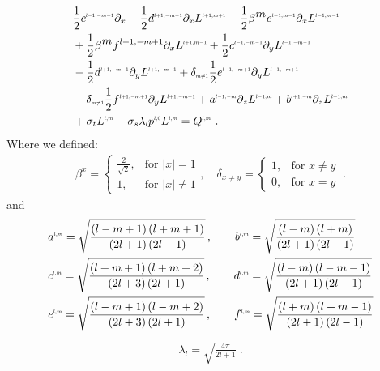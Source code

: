 \documentclass{egpubl}
\begin{document}
\begin{align}
&
\frac{1}{2}c^{\scaleto{l-1,-m-1}{4pt}}\partial_x
-\frac{1}{2}d^{\scaleto{l+1,-m-1}{4pt}}\partial_x L^{\scaleto{l+1,m+1}{4pt}}
-\frac{1}{2}\beta^{\scaleto{m}{4pt}}e^{\scaleto{l-1,m-1}{4pt}}\partial_x L^{\scaleto{l-1,m-1}{4pt}}
\nonumber
\\&
+\frac{1}{2}\beta^{\scaleto{m}{4pt}}f^{l+1,-m+1}\partial_x L^{\scaleto{l+1,m-1}{4pt}}
+\frac{1}{2}c^{\scaleto{l-1,-m-1}{4pt}}\partial_y L^{\scaleto{l-1,-m-1}{4pt}}
\nonumber
\\&
-\frac{1}{2}d^{\scaleto{l+1,-m-1}{4pt}}\partial_y L^{\scaleto{l+1,-m-1}{4pt}}
+\delta_{\scaleto{m\neq 1}{4pt}}\frac{1}{2}e^{\scaleto{l-1,-m+1}{4pt}}\partial_y L^{\scaleto{l-1,-m+1}{4pt}}
\nonumber
\\&
-\delta_{\scaleto{m\neq 1}{4pt}}\frac{1}{2}f^{\scaleto{l+1,-m+1}{4pt}}\partial_y L^{\scaleto{l+1,-m+1}{4pt}}
+a^{\scaleto{l-1,-m}{4pt}}\partial_z L^{\scaleto{l-1,m}{4pt}}
+b^{\scaleto{l+1,-m}{4pt}}\partial_z L^{\scaleto{l+1,m}{4pt}}
\nonumber
\\&
+\sigma_t L^{\scaleto{l,m}{4pt}}
-\sigma_s\lambda_{\scaleto{l}{4pt}}p^{\scaleto{l,0}{4pt}}L^{\scaleto{l,m}{4pt}}
= Q^{\scaleto{l,m}{4pt}} \ .
\end{align}
Where we defined:
\begin{align*}
\beta^{x}=
\left\{
\begin{array}{ll}
\frac{2}{\sqrt{2}}, & \text{for } \vert x\vert = 1\\
1, & \text{for } \vert x\vert \neq 1
\end{array}
\right.
,\quad
\delta_{x\neq y}=
\left\{
\begin{array}{ll}
1, & \text{for } x \neq y\\
0, & \text{for } x = y
\end{array}
\right. \ .
\end{align*}
and
\begin{align*}
&
a^{\scaleto{l,m}{4pt}}= \sqrt{\frac{\left(l-m+1\right)\left(l+m+1\right)}{\left(2l+1\right)\left(2l-1\right)}} \, , \qquad
b^{\scaleto{l,m}{4pt}}= \sqrt{\frac{\left(l-m\right)\left(l+m\right)}{\left(2l+1\right)\left(2l-1\right)}}
\\&
c^{\scaleto{l,m}{4pt}}= \sqrt{\frac{\left(l+m+1\right)\left(l+m+2\right)}{\left(2l+3\right)\left(2l+1\right)}} \, , \qquad
d^{\scaleto{l,m}{4pt}}= \sqrt{\frac{\left(l-m\right)\left(l-m-1\right)}{\left(2l+1\right)\left(2l-1\right)}}
\\&
e^{\scaleto{l,m}{4pt}}= \sqrt{\frac{\left(l-m+1\right)\left(l-m+2\right)}{\left(2l+3\right)\left(2l+1\right)}} \, , \qquad
f^{\scaleto{l,m}{4pt}}= \sqrt{\frac{\left(l+m\right)\left(l+m-1\right)}{\left(2l+1\right)\left(2l-1\right)}}
\end{align*}
\begin{align*}
\lambda_l=\sqrt{\frac{4\pi}{2l+1}} \ .
\end{align*}
\end{document}
